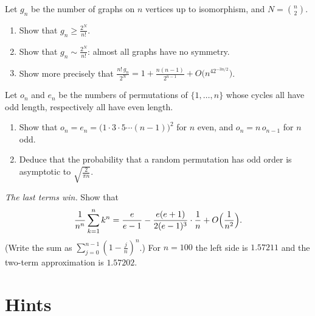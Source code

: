 \begin{exercise}[$\star\star\star$]\label{pb:unlabelled}
Let $g_n$ be the number of graphs on $n$ vertices up to isomorphism, and $N=\binom n2$.
\begin{enumerate}[label=(\alph*)]
\item Show that $g_n\ge\frac{2^N}{n!}$.
\item Show that $g_n\sim\frac{2^N}{n!}$: almost all graphs have no symmetry.
\item Show more precisely that $\frac{n!\,g_n}{2^N}=1+\frac{n(n-1)}{2^{n-1}}+O\bigl(n^42^{-3n/2}\bigr)$.
\end{enumerate}
\end{exercise}

\begin{exercise}[$\star\star$]\label{pb:oddcycles}
Let $o_n$ and $e_n$ be the numbers of permutations of $\{1,\dots,n\}$ whose cycles all have odd length, respectively all have
even length.
\begin{enumerate}[label=(\alph*)]
\item Show that $o_n=e_n=\bigl(1\cdot3\cdot5\cdots(n-1)\bigr)^2$ for $n$ even, and $o_n=n\,o_{n-1}$ for $n$ odd.
\item Deduce that the probability that a random permutation has odd order is asymptotic to $\sqrt{\frac2{\pi n}}$.
\end{enumerate}
\end{exercise}

\begin{exercise}[$\star$]\label{pb:powersum}
\emph{The last terms win.} Show that
\[
\frac1{n^n}\sum_{k=1}^nk^n=\frac e{e-1}-\frac{e(e+1)}{2(e-1)^3}\cdot\frac1n+O\Bigl(\frac1{n^2}\Bigr).
\]
(Write the sum as $\sum_{j=0}^{n-1}(1-\frac jn)^n$.) For $n=100$ the left side is $1.57211$ and the two-term approximation is $1.57202$.
\end{exercise}

\section{Hints}

